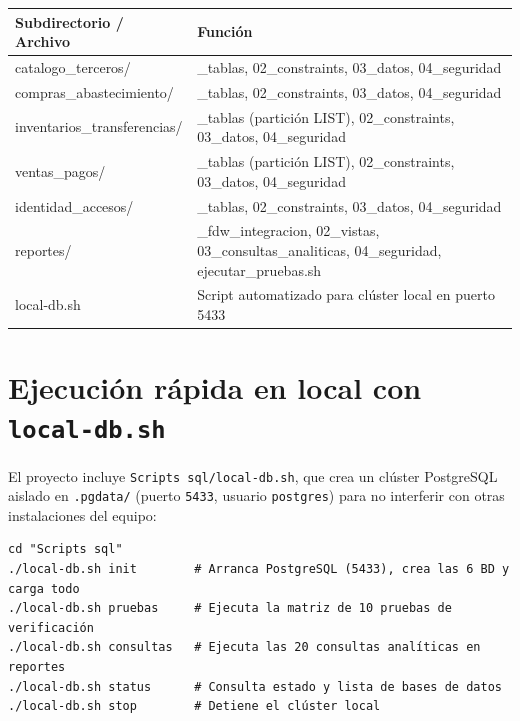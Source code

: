 \documentclass[11pt,oneside]{article}
\begin{document}
\begin{center}
\renewcommand{\arraystretch}{1.22}
{\small
\begin{tabularx}{\linewidth}{@{} >{\ttfamily}p{4.8cm} >{\raggedright\arraybackslash}X @{}}
\toprule
\rowcolor{fondo}
{\sffamily\bfseries Subdirectorio / Archivo} & {\sffamily\bfseries Funci\'on} \\
\midrule
catalogo\_terceros/          & 01\_tablas, 02\_constraints, 03\_datos, 04\_seguridad \\
compras\_abastecimiento/     & 01\_tablas, 02\_constraints, 03\_datos, 04\_seguridad \\
inventarios\_transferencias/ & 01\_tablas (partici\'on LIST), 02\_constraints, 03\_datos, 04\_seguridad \\
ventas\_pagos/               & 01\_tablas (partici\'on LIST), 02\_constraints, 03\_datos, 04\_seguridad \\
identidad\_accesos/          & 01\_tablas, 02\_constraints, 03\_datos, 04\_seguridad \\
reportes/                    & 01\_fdw\_integracion, 02\_vistas, 03\_consultas\_analiticas, 04\_seguridad, ejecutar\_pruebas.sh \\
local-db.sh                  & Script automatizado para cl\'uster local en puerto 5433 \\
\bottomrule
\end{tabularx}}
\end{center}

\section{Ejecuci\'on r\'apida en local con \texttt{local-db.sh}}

El proyecto incluye \texttt{Scripts sql/local-db.sh}, que crea un cl\'uster
PostgreSQL aislado en \texttt{.pgdata/} (puerto \texttt{5433}, usuario
\texttt{postgres}) para no interferir con otras instalaciones del equipo:

\begin{verbatim}
cd "Scripts sql"
./local-db.sh init        # Arranca PostgreSQL (5433), crea las 6 BD y carga todo
./local-db.sh pruebas     # Ejecuta la matriz de 10 pruebas de verificación
./local-db.sh consultas   # Ejecuta las 20 consultas analíticas en reportes
./local-db.sh status      # Consulta estado y lista de bases de datos
./local-db.sh stop        # Detiene el clúster local
\end{verbatim}
\end{document}
